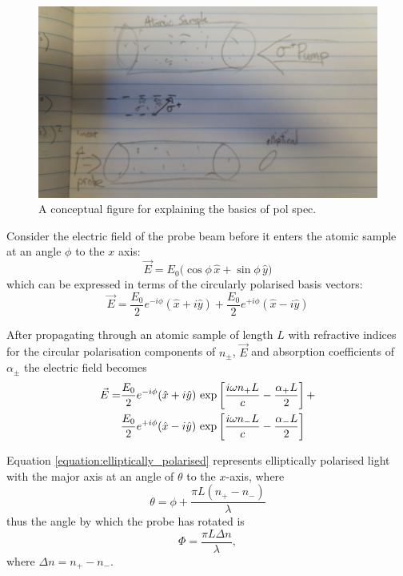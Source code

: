 \begin{figure}
\centering
\includegraphics[width=\linewidth,angle=180]{chapter1/Figs/pol_spec_explanation_placeholder.jpg}
\caption{A conceptual figure for explaining the basics of pol spec.}
\label{figure:pol_spec_explanation}
\end{figure}

Consider the electric field of the probe beam before it enters the atomic sample at an angle $\phi$ to the $x$ axis:
\begin{equation}
\vec{E}=E_0\big(\cos{\phi}\,\hat{x}+\sin{\phi}\,\hat{y}\big)
\end{equation}
which can be expressed in terms of the circularly polarised basis vectors:
\begin{equation}
\vec{E} = \frac{E_0}{2}e^{-i\phi}(\hat{x}+i\hat{y}) + \frac{E_0}{2}e^{+i\phi}(\hat{x}-i\hat{y})
\end{equation}

After propagating through an atomic sample of length $L$ with refractive indices for the circular polarisation components of $n_\pm$, $\vec{E}$ and absorption coefficients of $\alpha_\pm$ the electric field becomes
\begin{align}
\vec{E} = &\frac{E_0}{2}e^{-i\phi}(\hat{x}+i\hat{y})\,\exp\left[\frac{i\omega n_+ L}{c} - \frac{\alpha_+ L}{2}\right] +\notag\\
&\frac{E_0}{2}e^{+i\phi}(\hat{x}-i\hat{y})\,\exp\left[\frac{i\omega n_- L}{c} - \frac{\alpha_- L}{2}\right]\label{equation:elliptically_polarised}
\end{align}

Equation \ref{equation:elliptically_polarised} represents elliptically polarised light with the major axis at an angle of $\theta$ to the $x$-axis, where
\begin{equation}
\theta = \phi + \frac{\pi L (n_+ - n_-)}{\lambda}
\end{equation}
thus the angle by which the probe has rotated is
\begin{equation}
\Phi = \frac{\pi L \Delta n}{\lambda},
\end{equation}
where $\Delta n = n_+ - n_-$.

